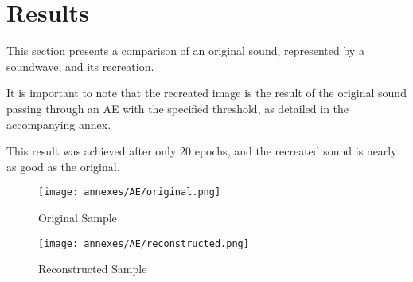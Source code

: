 \section{Results}

This section presents a comparison of an original sound, represented by a soundwave, and its recreation.

It is important to note that the recreated image is the result of the original sound passing through an \ac{AE} with the specified threshold, as detailed in the accompanying annex.

This result was achieved after only 20 epochs, and the recreated sound is nearly as good as the original.

\begin{figure}[ht]
    \centering
    \texttt{[image: annexes/AE/original.png]}
    \caption{Original Sample}
\end{figure}

\begin{figure}[ht]
    \centering
    \texttt{[image: annexes/AE/reconstructed.png]}
    \caption{Reconstructed Sample}
\end{figure}
